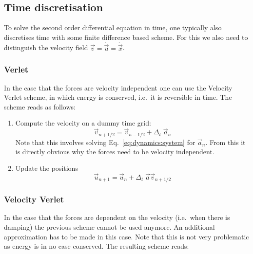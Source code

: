 \documentclass[times,namecite]{goose-article}
\begin{document}
\subsection{Time discretisation}
\label{eq:dynamics:time}

To solve the second order differential equation in time, one typically also discretises time with some finite difference based scheme. For this we also need to distinguish the velocity field $\vec{v} = \dot{\vec{u}} = \dot{\vec{x}}$.

\subsubsection{Verlet}

In the case that the forces are velocity independent one can use the Velocity Verlet scheme, in which energy is conserved, i.e.\ it is reversible in time. The scheme reads as follows:

\begin{enumerate}
  \item Compute the velocity on a dummy time grid:
  \begin{equation}
    \vec{v}_{n+1/2} = \vec{v}_{n-1/2} + \Delta_t \; \vec{a}_n
  \end{equation}
  Note that this involves solving Eq.~\eqref{eq:dynamics:system} for $\vec{a}_n$. From this it is directly obvious why the forces need to be velocity independent.
  \item Update the positions
  \begin{equation}
    \vec{u}_{n+1} = \vec{u}_n + \Delta_t \;\vec{a} \vec{v}_{n + 1/2}
  \end{equation}
\end{enumerate}

\subsubsection{Velocity Verlet}

In the case that the forces are dependent on the velocity (i.e.\ when there is damping) the previous scheme cannot be used anymore. An additional approximation has to be made in this case. Note that this is not very problematic as energy is in no case conserved. The resulting scheme reads:
\end{document}
